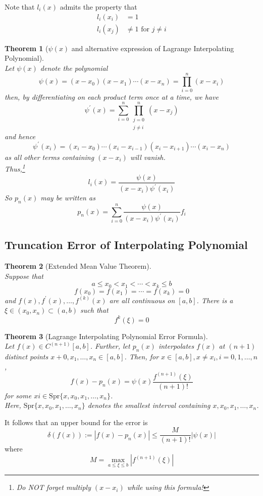 \documentclass[12pt]{article}
\newtheorem{theorem}{Theorem}[section]
\theoremstyle{definition}
\begin{document}
Note that $l_i(x)$ admits the property that
\begin{align*}
l_i(x_i)&=1\\
l_i(x_j)&\neq 1 \text{ for }j\neq i
\end{align*}
\begin{theorem}[$\psi(x)$ and alternative expression of Lagrange Interpolating Polynomial]
\hfill\\\normalfont Let $\psi(x)$ denote the polynomial
\[
\psi(x)=(x-x_0)(x-x_1)\cdots(x-x_n) = \prod_{i=0}^n (x-x_i)
\]
then, by differentiating on each product term once at a time, we have
\[
\psi^\prime(x) = \sum_{i=0}^n\prod_{\substack{j=0\\j\neq i}}^n (x-x_j)
\]
and hence
\[
\psi^\prime (x_i) = (x_i-x_0)\cdots(x_i-x_{i-1})(x_i-x_{i+1})\cdots(x_i-x_n)
\]
as all other terms containing $(x-x_i)$ will vanish.\\
Thus,\footnote{Do NOT forget multiply $(x-x_i)$ while using this formula!}
\[
l_i(x)=\frac{\psi(x)}{(x-x_i)\psi^\prime(x_i)}
\]
So $p_n(x)$ may be written as
\[
p_n(x)=\sum_{i=0}^n\frac{\psi(x)}{(x-x_i)\psi^\prime(x_i)} f_i
\]
\end{theorem}
\subsection{Truncation Error of Interpolating Polynomial}
\begin{theorem}[Extended Mean Value Theorem]
\hfill\\\normalfont Suppose that
\[
a\leq x_0<x_1<\cdots<x_k\leq b
\]
\[
f(x_0)=f(x_1)=\cdots = f(x_k)=0
\]
and $f(x),f^\prime(x),\ldots, f^{(k)}(x)$ are all continuous on $[a,b]$. There is a $\xi\in(x_0,x_n)\subset(a,b)$ such that
\[
f^k(\xi)=0
\]
\end{theorem}
\begin{theorem}[Lagrange Interpolating Polynomial Error Formula]
\hfill\\\normalfont Let $f(x)\in C^{(n+1)}[a,b]$. Further, let $p_n(x)$ interpolates $f(x)$ at $(n+1)$ distinct points $x+0,x_1,\ldots, x_n\in[a,b]$. Then, for $x\in[a,b], x\neq x_i, i = 0,1,\ldots, n$,
\[
f(x)-p_n(x)=\psi(x)\frac{f^{(n+1)}(\xi)}{(n+1)!}
\]
for some $xi\in\text{Spr}\{x,x_0,x_1,\ldots,x_n\}$.\\
Here, $\text{Spr}\{x,x_0,x_1,\ldots, x_n\}$ denotes the smallest interval containing $x,x_0,x_1,\ldots,x_n$.
\end{theorem}
It follows that an upper bound for the error is
\[
\delta(f(x)):=|f(x)-p_n(x)| \leq \frac{M}{(n+1)!}|\psi(x)|
\]
where
\[
M=\max_{a\leq \xi\leq b}|f^{(n+1)}(\xi)|
\]
\end{document}

